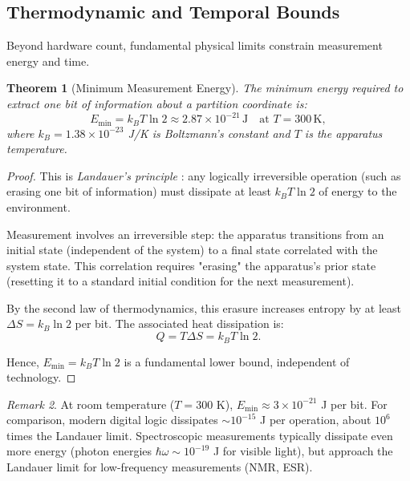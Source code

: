 \documentclass[twocolumn,10pt,a4paper]{article}
\newtheorem{theorem}{Theorem}[section]
\theoremstyle{remark}
\newtheorem{remark}[theorem]{Remark}
\begin{document}
\subsection{Thermodynamic and Temporal Bounds}

Beyond hardware count, fundamental physical limits constrain measurement energy and time.

\begin{theorem}[Minimum Measurement Energy]
\label{thm:min_energy}
The minimum energy required to extract one bit of information about a partition coordinate is:
\begin{equation}
E_{\min} = k_B T \ln 2 \approx 2.87 \times 10^{-21} \, \text{J} \quad \text{at } T = 300 \, \text{K},
\end{equation}
where $k_B = 1.38 \times 10^{-23}$ J/K is Boltzmann's constant and $T$ is the apparatus temperature.
\end{theorem}

\begin{proof}
This is \emph{Landauer's principle} \citep{Landauer1961}: any logically irreversible operation (such as erasing one bit of information) must dissipate at least $k_B T \ln 2$ of energy to the environment.

Measurement involves an irreversible step: the apparatus transitions from an initial state (independent of the system) to a final state correlated with the system state. This correlation requires "erasing" the apparatus's prior state (resetting it to a standard initial condition for the next measurement).

By the second law of thermodynamics, this erasure increases entropy by at least $\Delta S = k_B \ln 2$ per bit. The associated heat dissipation is:
\begin{equation}
Q = T \Delta S = k_B T \ln 2.
\end{equation}

Hence, $E_{\min} = k_B T \ln 2$ is a fundamental lower bound, independent of technology.
\end{proof}

\begin{remark}
At room temperature ($T = 300$ K), $E_{\min} \approx 3 \times 10^{-21}$ J per bit. For comparison, modern digital logic dissipates $\sim 10^{-15}$ J per operation, about $10^6$ times the Landauer limit. Spectroscopic measurements typically dissipate even more energy (photon energies $\hbar\omega \sim 10^{-19}$ J for visible light), but approach the Landauer limit for low-frequency measurements (NMR, ESR).
\end{remark}
\end{document}
